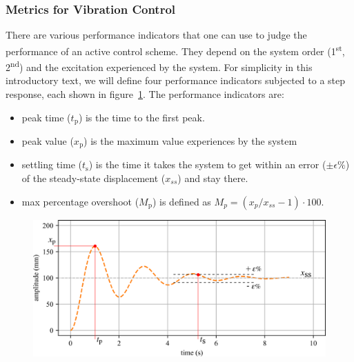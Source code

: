 \documentclass[12pt,letter]{article}
\begin{document}
\subsubsection{Metrics for Vibration Control}

There are various performance indicators that one can use to judge the performance of an active control scheme. They depend on the system order (1\textsuperscript{st}, 2\textsuperscript{nd}) and the excitation experienced by the system. For simplicity in this introductory text, we will define four performance indicators subjected to a step response, each shown in figure~\ref{fig:2nd_order_performance_indicators}. The performance indicators are:
\begin{itemize}[itemsep=0.25ex,topsep=0.25ex]
	\item peak time  ($t_\text{p}$) is the time to the first peak.
	\item peak value  ($x_\text{p}$) is the maximum value experiences by the system
	\item settling time ($t_\text{s}$) is the time it takes the system to get within an error ($\pm \epsilon \%$) of the steady-state displacement ($x_{ss}$) and stay there.
	\item max percentage overshoot ($M_\text{p}$) is defined as $M_p = ( {x_p} / {x_{ss}}-1 ) \cdot 100$.
\end{itemize}

\begin{figure}[H]
	\centering
	\includegraphics[]{../figures/2nd_order_performance_indicators}
	\label{fig:2nd_order_performance_indicators}
\end{figure}
\end{document}
